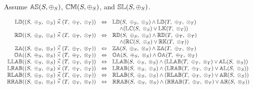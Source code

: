Assume 
${\mathbb{AS}}(S, \oplus_S)$, 
${\mathbb{CM}}(S, \oplus_S)$,  and 
${\mathbb{SL}}(S, \oplus_S)$. 

\[
\begin{array}{rcl} 
\propname{LD}((S,\ \oplus_S,\ \otimes_S) \lexprod (T,\ \oplus_T,\ \otimes_T)) 
   & \Leftrightarrow
   & \propname{LD}(S,\ \oplus_S,\ \otimes_S) 
     \wedge \propname{LD}(T,\ \oplus_T,\ \otimes_T)\\ 
   & 
   & \ \ \ \ \wedge ( \propname{LC}(S,\ \otimes_S) \vee \propname{LK}(T,\ \otimes_T) )
  \\
\propname{RD}((S,\ \oplus_S,\ \otimes_S) \lexprod (T,\ \oplus_T,\ \otimes_T)) 
   & \Leftrightarrow
   & \propname{RD}(S,\ \oplus_S,\ \otimes_S) 
    \wedge \propname{RD}(T,\ \oplus_T,\ \otimes_T) \\ 
   & 
   & \ \ \ \ \wedge ( \propname{RC}(S,\ \otimes_S) \vee \propname{RK}(T,\ \otimes_T) )
   \\ 
\propname{ZA}((S,\ \oplus_S,\ \otimes_S) \lexprod (T,\ \oplus_T,\ \otimes_T)) 
    & \Leftrightarrow
    & \propname{ZA}(S,\ \oplus_S,\ \otimes_S) \wedge \propname{ZA}(T,\ \oplus_T,\ \otimes_T)
   \\
\propname{OA}((S,\ \oplus_S,\ \otimes_S) \lexprod (T,\ \oplus_T,\ \otimes_T)) 
    & \Leftrightarrow
    & \propname{OA}(S,\ \oplus_S,\ \otimes_S) \wedge \propname{OA}(T,\ \oplus_T,\ \otimes_T)
   \\
\propname{LLAB}((S,\ \oplus_S,\ \otimes_S) \lexprod (T,\ \oplus_T,\ \otimes_T)) 
    & \Leftrightarrow
    & \propname{LLAB}(S,\ \oplus_S,\ \otimes_S) \wedge  
      (\propname{LLAB}(T,\ \oplus_T,\ \otimes_T) \vee \propname{AL}(S,\ \otimes_S)) 
    \\ 
\propname{LRAB}((S,\ \oplus_S,\ \otimes_S) \lexprod (T,\ \oplus_T,\ \otimes_T)) 
    & \Leftrightarrow
    & \propname{LRAB}(S,\ \oplus_S,\ \otimes_S) \wedge  
      (\propname{LRAB}(T,\ \oplus_T,\ \otimes_T) \vee \propname{AL}(S,\ \otimes_S)) 
    \\ 
\propname{RLAB}((S,\ \oplus_S,\ \otimes_S) \lexprod (T,\ \oplus_T,\ \otimes_T)) 
    & \Leftrightarrow
    & \propname{RLAB}(S,\ \oplus_S,\ \otimes_S) \wedge  
      (\propname{RLAB}(T,\ \oplus_T,\ \otimes_T) \vee \propname{AR}(S,\ \otimes_S)) 
    \\ 
\propname{RRAB}((S,\ \oplus_S,\ \otimes_S) \lexprod (T,\ \oplus_T,\ \otimes_T)) 
    & \Leftrightarrow
    & \propname{RRAB}(S,\ \oplus_S,\ \otimes_S) \wedge  
      (\propname{RRAB}(T,\ \oplus_T,\ \otimes_T) \vee \propname{AR}(S,\ \otimes_S)) 
    \\ 
\end{array} 
\]
